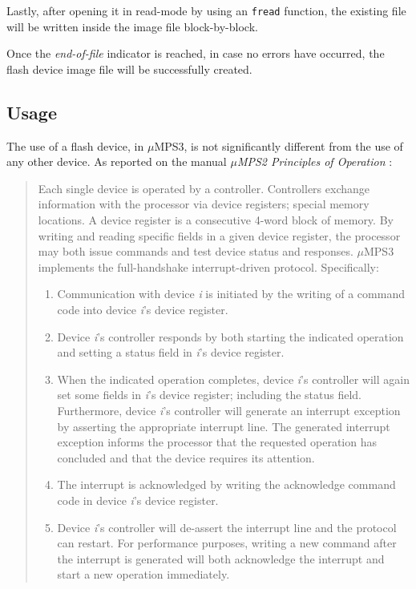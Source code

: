 \documentclass[12pt,a4paper,openright,twoside]{report}
\begin{document}
	Lastly, after opening it in read-mode by using an \texttt{fread} function, the existing file will be written inside the image file block-by-block.
	
	Once the \textit{end-of-file} indicator is reached, in case no errors have occurred, the flash device image file will be successfully created.

\subsection{Usage}
	The use of a flash device, in $\mu$MPS3, is not significantly different from the use of any other device. As reported on the manual \textit{$\mu$MPS2 Principles of Operation} \cite{pops}:
	\begin{quote}
	Each single device is operated by a controller.
	Controllers exchange information with the processor via device registers; special memory locations.
	A device register is a consecutive 4-word block of memory.
	By writing and reading specific fields in a given device register, the processor may both issue commands and test device status and responses.
	$\mu$MPS3 implements the full-handshake interrupt-driven protocol.
	Specifically:
	\begin{enumerate}
	\item Communication with device \textit{i} is initiated by the writing of a command code into device \textit{i}'s device register.
	\item Device \textit{i}'s controller responds by both starting the indicated operation and setting a status field in \textit{i}'s device register.
	\item When the indicated operation completes, device \textit{i}'s controller will again set some fields in \textit{i}'s device register; including the status field.
	Furthermore, device \textit{i}'s controller will generate an interrupt exception by asserting the appropriate interrupt line.
	The generated interrupt exception informs the processor that the requested operation has concluded and that the device requires its attention.
	\item The interrupt is acknowledged by writing the acknowledge command code in device \textit{i}'s device register.
	\item Device \textit{i}'s controller will de-assert the interrupt line and the protocol can restart.
	For performance purposes, writing a new command after the interrupt is generated will both acknowledge the interrupt and start a new operation immediately.
	\end{enumerate}
	\end{quote}
\end{document}

